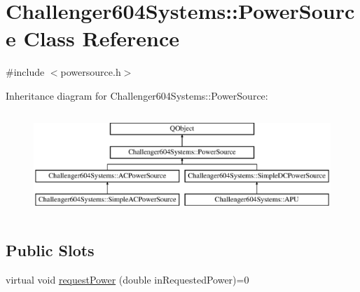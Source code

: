 \hypertarget{class_challenger604_systems_1_1_power_source}{\section{Challenger604\-Systems\-:\-:Power\-Source Class Reference}
\label{class_challenger604_systems_1_1_power_source}
}


{\ttfamily \#include $<$powersource.\-h$>$}

Inheritance diagram for Challenger604\-Systems\-:\-:Power\-Source\-:\begin{figure}[H]
\begin{center}
\leavevmode
\includegraphics[height=3.902439cm]{class_challenger604_systems_1_1_power_source}
\end{center}
\end{figure}
\subsection*{Public Slots}
\begin{DoxyCompactItemize}
\item 
virtual void \hyperlink{class_challenger604_systems_1_1_power_source_a7337c7de30e3d23c551d3a41370b34bb}{request\-Power} (double in\-Requested\-Power)=0
\end{DoxyCompactItemize}
